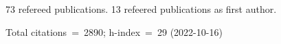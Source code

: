 73 refereed publications. 13 refeered publications as first author.

Total citations~=~2890; h-index~=~29 (2022-10-16)